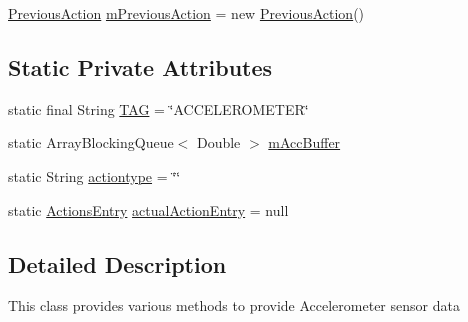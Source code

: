 \begin{DoxyCompactItemize}
\item 
\hyperlink{classcs_1_1nsense_1_1accelerometer_1_1_accelerometer_pipeline_1_1_previous_action}{Previous\-Action} \hyperlink{classcs_1_1nsense_1_1accelerometer_1_1_accelerometer_pipeline_a0b89c3190d00649a5ce72997490db7f5}{m\-Previous\-Action} = new \hyperlink{classcs_1_1nsense_1_1accelerometer_1_1_accelerometer_pipeline_1_1_previous_action}{Previous\-Action}()
\end{DoxyCompactItemize}
\subsection*{Static Private Attributes}
\begin{DoxyCompactItemize}
\item 
static final String \hyperlink{classcs_1_1nsense_1_1accelerometer_1_1_accelerometer_pipeline_ae711194fe785db6045f4b733728fa616}{T\-A\-G} = \char`\"{}A\-C\-C\-E\-L\-E\-R\-O\-M\-E\-T\-E\-R\char`\"{}
\item 
static Array\-Blocking\-Queue$<$ Double $>$ \hyperlink{classcs_1_1nsense_1_1accelerometer_1_1_accelerometer_pipeline_a2a5fe6f1e2fc156d75891bfcf4d527a1}{m\-Acc\-Buffer}
\item 
static String \hyperlink{classcs_1_1nsense_1_1accelerometer_1_1_accelerometer_pipeline_a95d30b2dc5307bc407e4766cd809f525}{actiontype} = \char`\"{}\char`\"{}
\item 
static \hyperlink{classcs_1_1nsense_1_1accelerometer_1_1_actions_entry}{Actions\-Entry} \hyperlink{classcs_1_1nsense_1_1accelerometer_1_1_accelerometer_pipeline_a7051b9392a37bdcb4dc5d6c3c33870ac}{actual\-Action\-Entry} = null
\end{DoxyCompactItemize}


\subsection{Detailed Description}
This class provides various methods to provide Accelerometer sensor data 

